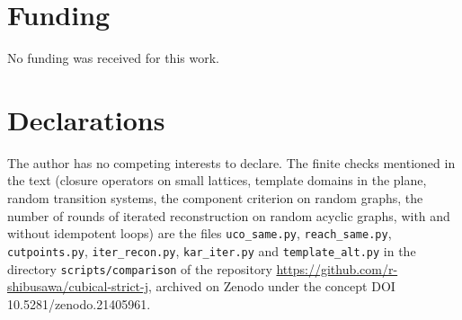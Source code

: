 \documentclass[11pt]{amsart}
\theoremstyle{definition}
\begin{document}
\section*{Funding}
No funding was received for this work.

\section*{Declarations}
The author has no competing interests to declare. The finite checks
mentioned in the text (closure operators on small lattices, template
domains in the plane, random transition systems, the component criterion
on random graphs, the number of rounds of iterated reconstruction on
random acyclic graphs, with and without idempotent loops) are the files
\texttt{uco\_same.py}, \texttt{reach\_same.py}, \texttt{cutpoints.py},
\texttt{iter\_recon.py}, \texttt{kar\_iter.py} and \texttt{template\_alt.py}
in the directory \texttt{scripts/comparison} of the repository
\url{https://github.com/r-shibusawa/cubical-strict-j}, archived on Zenodo
under the concept DOI 10.5281/zenodo.21405961.
\end{document}
